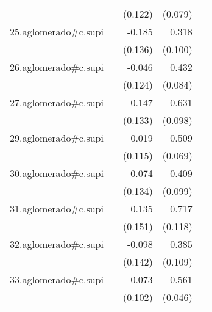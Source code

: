 {\begin{longtable}{l*{4}{D{.}{.}{-1}}}
            &                     &     (0.122)         &     (0.079)         &                     \\
\addlinespace
25.aglomerado#c.supi&                     &      -0.185         &       0.318\sym{**} &                     \\
            &                     &     (0.136)         &     (0.100)         &                     \\
\addlinespace
26.aglomerado#c.supi&                     &      -0.046         &       0.432\sym{***}&                     \\
            &                     &     (0.124)         &     (0.084)         &                     \\
\addlinespace
27.aglomerado#c.supi&                     &       0.147         &       0.631\sym{***}&                     \\
            &                     &     (0.133)         &     (0.098)         &                     \\
\addlinespace
29.aglomerado#c.supi&                     &       0.019         &       0.509\sym{***}&                     \\
            &                     &     (0.115)         &     (0.069)         &                     \\
\addlinespace
30.aglomerado#c.supi&                     &      -0.074         &       0.409\sym{***}&                     \\
            &                     &     (0.134)         &     (0.099)         &                     \\
\addlinespace
31.aglomerado#c.supi&                     &       0.135         &       0.717\sym{***}&                     \\
            &                     &     (0.151)         &     (0.118)         &                     \\
\addlinespace
32.aglomerado#c.supi&                     &      -0.098         &       0.385\sym{***}&                     \\
            &                     &     (0.142)         &     (0.109)         &                     \\
\addlinespace
33.aglomerado#c.supi&                     &       0.073         &       0.561\sym{***}&                     \\
            &                     &     (0.102)         &     (0.046)         &                     \\

\end{longtable}}
